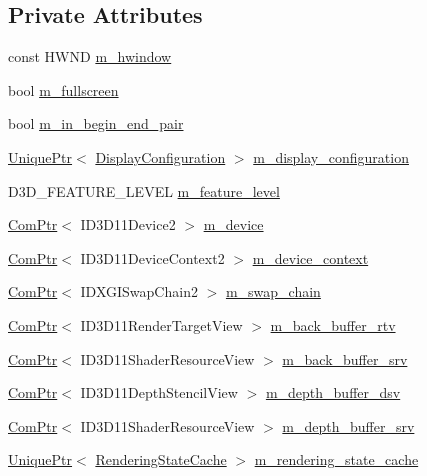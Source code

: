 \subsection*{Private Attributes}
\begin{DoxyCompactItemize}
\item 
const H\+W\+ND \hyperlink{classmage_1_1_renderer_adadc1028e5ad6551abbecfd8529e4aa1}{m\+\_\+hwindow}
\item 
bool \hyperlink{classmage_1_1_renderer_a72bb88b17491bd388460afae9d207b0a}{m\+\_\+fullscreen}
\item 
bool \hyperlink{classmage_1_1_renderer_a3caa1bad6cbfde8f87f807e5c97924e3}{m\+\_\+in\+\_\+begin\+\_\+end\+\_\+pair}
\item 
\hyperlink{namespacemage_a3316d7143a973e37adf1110f2e80ca31}{Unique\+Ptr}$<$ \hyperlink{structmage_1_1_display_configuration}{Display\+Configuration} $>$ \hyperlink{classmage_1_1_renderer_ab5638066fba5a0b9ce307f7db3ba5433}{m\+\_\+display\+\_\+configuration}
\item 
D3\+D\+\_\+\+F\+E\+A\+T\+U\+R\+E\+\_\+\+L\+E\+V\+EL \hyperlink{classmage_1_1_renderer_aa97b108ef58f7d41ddb527f6ba2bfdf9}{m\+\_\+feature\+\_\+level}
\item 
\hyperlink{namespacemage_ae74f374780900893caa5555d1031fd79}{Com\+Ptr}$<$ I\+D3\+D11\+Device2 $>$ \hyperlink{classmage_1_1_renderer_aecf4bcb70dc186b4f2083df38d1e4bc3}{m\+\_\+device}
\item 
\hyperlink{namespacemage_ae74f374780900893caa5555d1031fd79}{Com\+Ptr}$<$ I\+D3\+D11\+Device\+Context2 $>$ \hyperlink{classmage_1_1_renderer_a47c4a1d46e84bbdc3ec876809633877e}{m\+\_\+device\+\_\+context}
\item 
\hyperlink{namespacemage_ae74f374780900893caa5555d1031fd79}{Com\+Ptr}$<$ I\+D\+X\+G\+I\+Swap\+Chain2 $>$ \hyperlink{classmage_1_1_renderer_a5419a7a11e8f0f69e92dd6a5cb9bd217}{m\+\_\+swap\+\_\+chain}
\item 
\hyperlink{namespacemage_ae74f374780900893caa5555d1031fd79}{Com\+Ptr}$<$ I\+D3\+D11\+Render\+Target\+View $>$ \hyperlink{classmage_1_1_renderer_a8569a868dc96be6d831dcbe1d775f4d1}{m\+\_\+back\+\_\+buffer\+\_\+rtv}
\item 
\hyperlink{namespacemage_ae74f374780900893caa5555d1031fd79}{Com\+Ptr}$<$ I\+D3\+D11\+Shader\+Resource\+View $>$ \hyperlink{classmage_1_1_renderer_adddf1283111a3c43a7957411688136b8}{m\+\_\+back\+\_\+buffer\+\_\+srv}
\item 
\hyperlink{namespacemage_ae74f374780900893caa5555d1031fd79}{Com\+Ptr}$<$ I\+D3\+D11\+Depth\+Stencil\+View $>$ \hyperlink{classmage_1_1_renderer_a8f5a70294790d4fbbb8237c587f88bb5}{m\+\_\+depth\+\_\+buffer\+\_\+dsv}
\item 
\hyperlink{namespacemage_ae74f374780900893caa5555d1031fd79}{Com\+Ptr}$<$ I\+D3\+D11\+Shader\+Resource\+View $>$ \hyperlink{classmage_1_1_renderer_ac5b85fc464bceb434748d8a44243788c}{m\+\_\+depth\+\_\+buffer\+\_\+srv}
\item 
\hyperlink{namespacemage_a3316d7143a973e37adf1110f2e80ca31}{Unique\+Ptr}$<$ \hyperlink{structmage_1_1_rendering_state_cache}{Rendering\+State\+Cache} $>$ \hyperlink{classmage_1_1_renderer_a3d9f823ecef314a974c4cdb3a71a1853}{m\+\_\+rendering\+\_\+state\+\_\+cache}
\end{DoxyCompactItemize}


